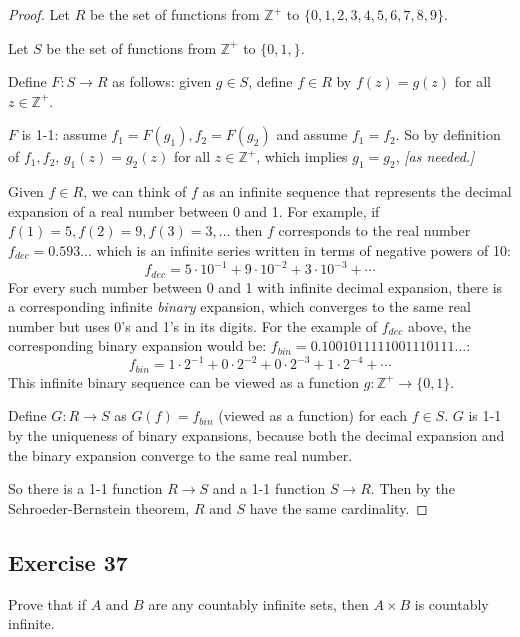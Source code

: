 \documentclass[14pt]{extarticle}
\newcommand{\Z}{\mathbb{Z}}
\begin{document}
\begin{proof}
    Let $R$ be the set of functions from \(\Z^+\) to \(\{0, 1, 2, 3, 4, 5, 6, 7, 8, 9\}\).

    Let $S$ be the set of functions from \(\Z^+\) to \(\{0, 1,\}\).

    Define \(F: S \to R\) as follows: given $g \in S$, define $f \in R$ by \(f(z) = g(z)\) for all \(z \in \Z^+\).

    $F$ is 1-1: assume \(f_1 = F(g_1), f_2 = F(g_2)\) and assume \(f_1 = f_2\). So by definition of \(f_1, f_2\),
    \(g_1(z) = g_2(z)\) for all \(z \in \Z^+\), which implies \(g_1 = g_2\), {\it [as needed.]}

    Given \(f \in R\), we can think of $f$ as an infinite sequence that represents the decimal expansion of a real
    number between 0 and 1. For example, if \(f(1) = 5, f(2) = 9, f(3) = 3, \ldots\) then $f$ corresponds to the real
    number \(f_{dec} = 0.593...\) which is an infinite series written in terms of negative powers of 10:
    \[
        f_{dec} = 5 \cdot 10^{-1} + 9 \cdot 10^{-2} + 3 \cdot 10^{-3} + \cdots
    \]
    For every such number between 0 and 1 with infinite decimal expansion, there is a corresponding infinite {\it binary}
    expansion, which converges to the same real number but uses 0's and 1's in its digits. For the example of $f_{dec}$
    above, the corresponding binary expansion would be: \(f_{bin} = 0.1001011111001110111...\):
    \[
        f_{bin} = 1 \cdot 2^{-1} + 0 \cdot 2^{-2} + 0 \cdot 2^{-3} + 1 \cdot 2^{-4} + \cdots
    \]
    This infinite binary sequence can be viewed as a function \(g:\Z^+ \to\{0,1\}\).

    Define \(G: R \to S\) as \(G(f) = f_{bin}\) (viewed as a function) for each $f \in S$. $G$ is 1-1 by the uniqueness
    of binary expansions, because both the decimal expansion and the binary expansion converge to the same real number.

    So there is a 1-1 function $R \to S$ and a 1-1 function $S \to R$. Then by the Schroeder-Bernstein theorem, $R$ and
    $S$ have the same cardinality.
\end{proof}

\subsection{Exercise 37}
Prove that if $A$ and $B$ are any countably infinite sets, then \(A \times B\) is countably infinite.
\end{document}

